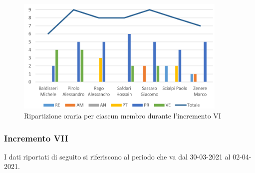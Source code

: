 \begin{figure}[!htb]   
    \centering
    \includegraphics[width=0.9\textwidth]{Images/inc6}
	\caption{Ripartizione oraria per ciascun membro durante l'incremento VI}
\end{figure}

\subsubsection{Incremento VII}

I dati riportati di seguito si riferiscono al periodo che va dal 30-03-2021 al 02-04-2021.

